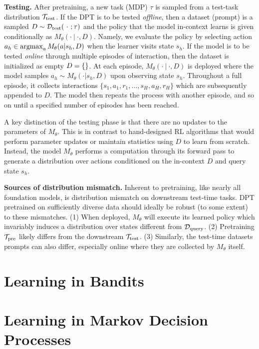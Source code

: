 \documentclass{article}
\begin{document}
\textbf{Testing.} 
After pretraining, a new task (MDP) $\tau$ is sampled from a test-task distribution ${\mathcal{T}}_{\text{test}}$. If the DPT is to be tested \emph{offline}, then a dataset (prompt) is a sampled $D \sim \mathcal{D}_{\text{test}}(\ \cdot \ ; \tau)$ and the policy that the model in-context learns is given conditionally as $M_{\theta}(\cdot \ | \ \cdot, D)$. Namely, we evaluate the policy by selecting action $a_h \in \mathop{\mathrm{argmax}}_{a} M_{\theta}(a | s_h, D)$ when the learner visits state $s_h$. 
If the model is to be tested \emph{online} through multiple episodes of interaction, then the dataset is initialized as empty $D = \{\empty\}$. At each episode, $M_{\theta}(\cdot \ | \ \cdot, D)$ is deployed where the model samples $a_h \sim M_{\theta}(\cdot  |s_h, D)$ upon observing state $s_h$. Throughout a full episode, it collects interactions $\{s_1, a_1, r_1, \ldots, s_H, a_H, r_H\}$ which are subsequently appended to $D$. The model then repeats the process with another episode, and so on until a specified number of episodes has been reached.

A key distinction of the testing phase is that there are no updates to the parameters of $M_\theta$. 
This is in contrast to hand-designed RL algorithms that would perform parameter updates or maintain statistics using  $D$ to learn from scratch. Instead, the model $M_{\theta}$ performs a computation through its forward pass to generate a distribution over actions conditioned on the in-context $D$ and query state $s_h$. 


\textbf{Sources of distribution mismatch.}  
Inherent to pretraining, like nearly all foundation models, is distribution mismatch on downstream test-time tasks. DPT pretrained on sufficiently diverse data should ideally be robust (to some extent) to these mismatches. (1) When deployed, $M_{\theta}$ will execute its learned policy which invariably induces a distribution over states different from $\mathcal{D}_{\text{query}}$. (2) Pretraining ${\mathcal{T}}_{\text{pre}}$ likely differs from the downstream ${\mathcal{T}}_{\text{test}}$. (3) Similarly, the test-time datasets prompts can also differ, especially online where they are collected by $M_{\theta}$ itself.





\section{Learning in Bandits}\label{sec:bandits}


\section{Learning in Markov Decision Processes}
\end{document}
